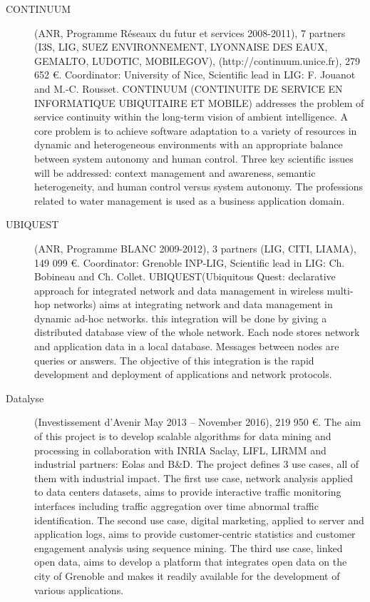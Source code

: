 \begin{description}
\item[CONTINUUM] (ANR, Programme R{\'e}seaux du futur et services 2008-2011),  7 partners (I3S, LIG, SUEZ ENVIRONNEMENT, LYONNAISE DES EAUX, GEMALTO, LUDOTIC, MOBILEGOV), (http://continuum.unice.fr), 279 652 \euro. Coordinator: University of Nice, Scientific lead in LIG: F. Jouanot and M.-C. Rousset. 
CONTINUUM (CONTINUITE DE SERVICE EN INFORMATIQUE UBIQUITAIRE ET MOBILE) addresses the problem of service continuity within the long-term vision of ambient intelligence. A core problem is to achieve software adaptation to a variety of resources in dynamic and heterogeneous environments with an appropriate balance between system autonomy and human control. Three key scientific issues will be addressed: context management and awareness, semantic heterogeneity, and human control versus system autonomy. The professions related to water management is used as a business application domain.

\item[UBIQUEST] (ANR, Programme BLANC 2009-2012), 3 partners (LIG, CITI, LIAMA), 149 099 \euro. Coordinator: Grenoble INP-LIG, Scientific lead in LIG: Ch. Bobineau and Ch. Collet.
UBIQUEST(Ubiquitous Quest: declarative approach for integrated network and data management in wireless multi-hop networks) aims at integrating network and data management in dynamic ad-hoc networks. this integration will be done by giving a distributed database view of the whole network. Each node stores network and application data in a local database. Messages between nodes are queries or answers. The objective of this integration is the rapid development and deployment of applications and network protocols.

\item[Datalyse] (Investissement d’Avenir May 2013 -- November 2016), 219 950 \euro.
The aim of this project is to develop scalable algorithms for data mining and processing in collaboration with INRIA Saclay, LIFL, LIRMM and industrial partners: Eolas and B\&D. The project defines 3 use cases, all of them with industrial impact. The first use case, network analysis applied to data centers datasets, aims to provide interactive traffic monitoring interfaces including traffic aggregation over time abnormal traffic identification. The second use case, digital marketing, applied to server and application logs, aims to provide customer-centric statistics and customer engagement analysis using sequence mining. The third use case, linked open data, aims to develop a platform that integrates open data on the city of Grenoble and makes it readily available for the development of various applications.


\end{description}
